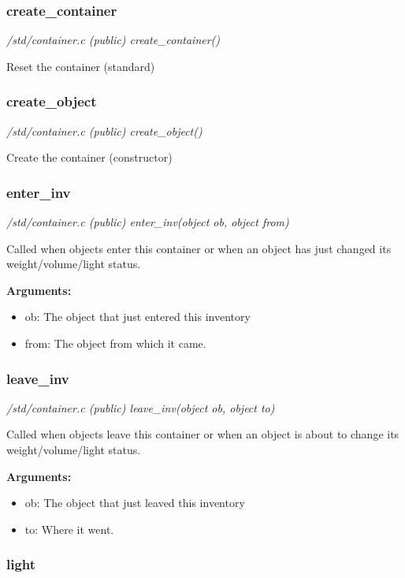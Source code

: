 \subsubsection{create\_container}

{\em /std/container.c (public) create\_container()}

Reset the container (standard)


\subsubsection{create\_object}

{\em /std/container.c (public) create\_object()}

Create the container (constructor)


\subsubsection{enter\_inv}

{\em /std/container.c (public) enter\_inv(object ob, object from)}

Called when objects enter this container or when an
object has just changed its weight/volume/light status.

{\bf Arguments:}
\begin{itemize}
\item      ob: The object that just entered this inventory
\item from: The object from which it came.
\end{itemize}


\subsubsection{leave\_inv}

{\em /std/container.c (public) leave\_inv(object ob, object to)}

Called when objects leave this container or when an
object is about to change its weight/volume/light status.

{\bf Arguments:}
\begin{itemize}
\item      ob: The object that just leaved this inventory
\item to: Where it went.
\end{itemize}


\subsubsection{light}

